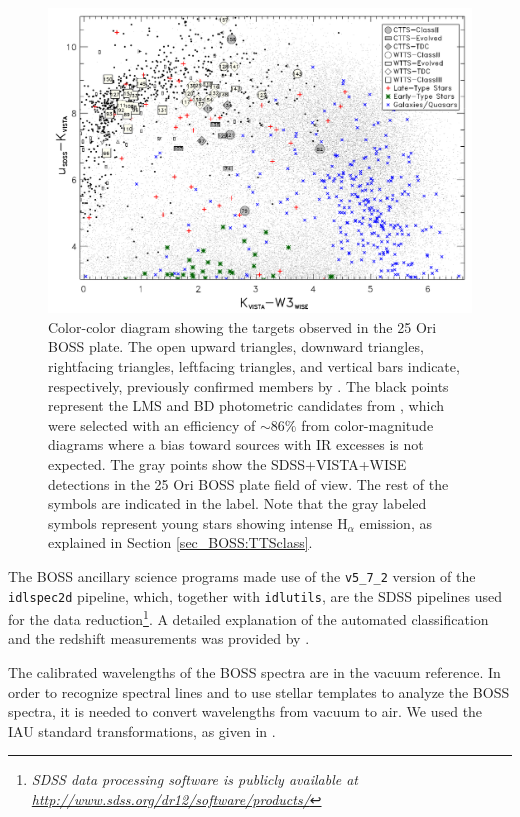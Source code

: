 \documentclass[12pt]{article}
\begin{document}
\begin{figure}[ht!]
	\centering
	\includegraphics[width=1.\textwidth]{f2.pdf}
	\caption[Color-color diagram of the targets in the 25 Ori BOSS plate]{Color-color diagram showing the targets observed in the 25 Ori BOSS plate. The open upward triangles, downward triangles, rightfacing triangles, leftfacing triangles, and vertical bars indicate, respectively, previously confirmed members by \citet{Briceno2005,  Briceno2007, Downes2014, Downes2015, Briceno2018}. The black points represent the LMS and BD photometric candidates from \citet{Downes2014}, which were selected with an efficiency of $\sim 86\%$ from color-magnitude diagrams where a bias toward sources with IR excesses is not expected. The gray points show the SDSS+VISTA+WISE detections in the 25 Ori BOSS plate field of view. The rest of the symbols are indicated in the label. Note that the gray labeled symbols represent young stars showing intense H$_\alpha$ emission, as explained in Section \ref{sec_BOSS:TTSclass}.}
	\label{fig_BOSS:CCD_bias}
\end{figure}

The BOSS ancillary science programs made use of the \texttt{v5\_7\_2} version of the \texttt{idlspec2d} pipeline, which, together with \texttt{idlutils}, are the SDSS pipelines used for the data reduction\footnote {\emph{\footnotesize SDSS data processing software is publicly available at \url{http://www.sdss.org/dr12/software/products/}}}. A detailed explanation of the automated classification and the redshift measurements was provided by \citet{Bolton2012}.

The calibrated wavelengths of the BOSS spectra are in the vacuum reference. In order to recognize spectral lines and to use stellar templates to analyze the BOSS spectra, it is needed to convert wavelengths from vacuum to air. We used the IAU standard transformations, as given in \citet{Morton1991}.
\end{document}

